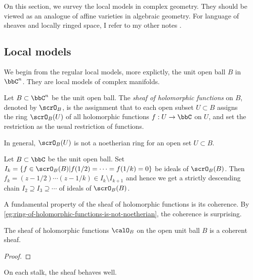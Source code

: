 
On this section, we survey the local models in complex geometry.
They should be viewed as an analogue of affine varieties in algebraic geometry.
For language of sheaves and locally ringed space, I refer to my other notes \Yang{}.

\subsection{Local models}

We begin from the regular local models, more explictly, the unit open ball $B$ in $\bbC^n$.
They are local models of complex manifolds.

\begin{definition}\label{def:sheaf-of-holomorphic-functions-on-unit-open-ball}
	Let \(B \subset \bbC^n\) be the unit open ball.
	The \emph{sheaf of holomorphic functions} on \(B\), denoted by \(\scrO_B\),
	is the assignment that to each open subset \(U \subset B\) assigns the ring \(\scrO_B(U)\) of all holomorphic functions $f:U \to \bbC$ on \(U\),
	and set the restriction as the usual restriction of functions.
\end{definition}

In general, \(\scrO_B(U)\) is not a noetherian ring for an open set \(U \subset B\).

\begin{example}\label{eg:ring-of-holomorphic-functions-is-not-noetherian}
	Let $B \subset \bbC$ be the unit open ball.
	Set $I_k = \{f \in \scrO_B(B) | f(1/2) = \cdots = f(1/k) = 0\}$ be ideals of $\scrO_B(B)$.
	Then $f_k = (z-1/2)\cdots (z-1/k) \in I_k \setminus I_{k+1}$ and hence we get a strictly descending chain $I_2 \supseteq I_3 \supseteq \cdots$ of ideals of $\scrO_B(B)$.
\end{example}

A fundamental property of the sheaf of holomorphic functions is its coherence.
By \cref{eg:ring-of-holomorphic-functions-is-not-noetherian}, the coherence is surprising.

\begin{theorem}\label{thm:Oka-coherence-theorem-for-open-subsets}
	The sheaf of holomorphic functions \(\calO_B\) on the open unit ball $B$ is a coherent sheaf.
\end{theorem}
\begin{proof}
	\Yang{}
\end{proof}

On each stalk, the sheaf behaves well.

